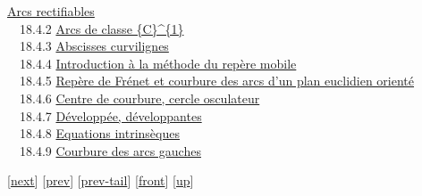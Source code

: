 \documentclass[]{article}
\begin{document}
\href{coursse99.html\#x120-55700018.4.1}{Arcs rectifiables} \\ ~~18.4.2
\href{coursse99.html\#x120-55800018.4.2}{Arcs de classe \{C\}\^{}\{1\}}
\\ ~~18.4.3 \href{coursse99.html\#x120-55900018.4.3}{Abscisses
curvilignes} \\ ~~18.4.4
\href{coursse99.html\#x120-56000018.4.4}{Introduction à la méthode du
repère mobile} \\ ~~18.4.5
\href{coursse99.html\#x120-56100018.4.5}{Repère de Frénet et courbure
des arcs d'un plan euclidien orienté} \\ ~~18.4.6
\href{coursse99.html\#x120-56200018.4.6}{Centre de courbure, cercle
osculateur} \\ ~~18.4.7
\href{coursse99.html\#x120-56300018.4.7}{Développée, développantes} \\
~~18.4.8 \href{coursse99.html\#x120-56400018.4.8}{Equations
intrinsèques} \\ ~~18.4.9
\href{coursse99.html\#x120-56500018.4.9}{Courbure des arcs gauches}

{[}\href{coursch20.html}{next}{]} {[}\href{coursch18.html}{prev}{]}
{[}\href{coursch18.html\#tailcoursch18.html}{prev-tail}{]}
{[}\href{coursch19.html}{front}{]}
{[}\href{cours.html\#coursch19.html}{up}{]}
\end{document}
